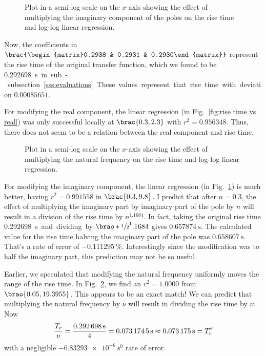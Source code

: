\documentclass[12pt]{article}
\DeclarePairedDelimiter\brao()%
\DeclarePairedDelimiter\brac[]%
\newcommand{\setprime}[2][1]{%
    {#2}^{%
        \raisebox{1pt}{%
            \scalebox{0.5}{%
                \itshape\sffamily\uppercase%
                \expandafter{%
                    \romannumeral#1%
                }%
            }%
        }
    }%
}%
\begin{document}
\begin{figure}
    \centering
    \caption{Plot in a semi-log scale on the $x$-axis
    showing the effect of multiplying the imaginary component of the poles on the rise time and log-log linear regression.}
    \label{fig:rise time vs imag}
\end{figure}

Now, the coefficients in $\brac{\begin{matrix}0.2938 & 0.2931 & 0.2930\end{matrix}}$ represent the rise time of the original transfer function,
which we found to be \SI{0.292698}\second in sub-subsection~\ref{sss:evaluations}.
These values represent that rise time with deviation $\num{0.00085651}$.

For modifying the real component, the linear regression
(in Fig.~\ref{fig:rise time vs real})
was only successful locally at $\brac{0.3, 2.3}$ with $r^2 = \num{0.956348}$.
Thus, there does not seem to be a relation between the real component and rise time.

\begin{figure}
    \centering
    \caption{Plot in a semi-log scale on the $x$-axis
    showing the effect of multiplying the natural frequency on the rise time and log-log linear regression.}
    \label{fig:rise time vs wn}
\end{figure}

For modifying the imaginary component, the linear regression
(in Fig.~\ref{fig:rise time vs imag})
is much better, having $r^2 = 0.991558$ in $\brac{0.3, 9.8}$.
I predict that after $n = 0.3$, the effect of multiplying the imaginary part by imaginary part of the pole by $n$ will result in a division of the rise time by $n^{1.1684}$.
In fact, taking the original rise time \SI{0.292698}\second and dividing by $\brao*{\sfrac12}^1.1684$ gives $\SI{0.657874}\second$.
The calculated value for the rise time halving the imaginary part of the pole was $\SI{0.658607}\second$.
That's a rate of error of $\SI{-0.111295}\percent$.
Interestingly since the modification was to half the imaginary part, this prediction may not be so useful.

Earlier, we speculated that modifying the natural frequency uniformly moves the range of the rise time.
In Fig.~\ref{fig:rise time vs wn}, we find an $r^2 = 1.0000$ from $\brao{0.05, 19.3955}$.
This appears to be an exact match!
We can predict that multiplying the natural frequency by $\nu$ will result in dividing the rise time by $\nu$.
Now
\begin{equation}
    \frac{T_r}\nu = \frac{\SI{0.292698}\second}4 = \SI{0.0731745}\second \approx \SI{0.073175}\second = \setprime[3]{T}_r
\end{equation}
with a negligible $\SI{-6.83293e-6}{\second^0}$ rate of error.
\end{document}
